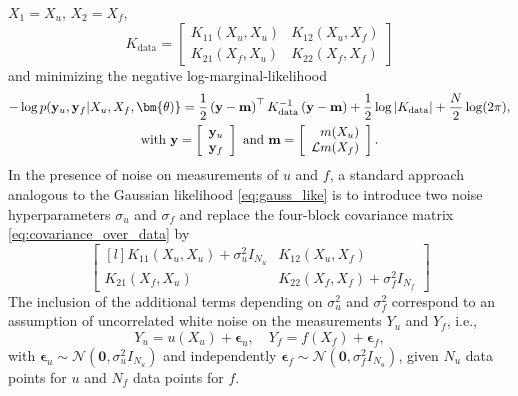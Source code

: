 ${X}_1 = {X}_u$, ${X}_2 = {X}_f$,
\begin{equation}\label{eq:covariance_over_data}
K_{\text{data}}=
\begin{bmatrix}
K_{11}({X}_u,{X}_u) & 
K_{12}({X}_u,{X}_f) \\ 
K_{21}({X}_f,{X}_u) &
K_{22}({X}_f,{X}_f)
\end{bmatrix}
\end{equation}
and minimizing the negative log-marginal-likelihood
\begin{multline}
\label{NLML}
-\log{p(\bold{y}_u,\bold{y}_f|X_u,X_f,\bm{\theta)}} = 
\frac{1}{2} \left(
\mathbf{y}-\mathbf{m}
\right)^{\top}
K_{\text{data}}^{-1}
\left(
\mathbf{y}-\mathbf{m}
\right)
 + \frac{1}{2}\log |{K}_{\text{data}}| + \frac{N}{2} \log (2\pi), \\
\text{with } 
\mathbf{y} 
= 
\left[
\begin{array}{c}
\mathbf{y}_u \\ 
\mathbf{y}_f
\end{array} 
\right]
\text{ and }
\mathbf{m} 
=
\left[
\begin{array}{c}
\phantom{\mathcal{L}} m({X}_u) \\ 
\mathcal{L} m({X}_f)
\end{array} 
\right].
\end{multline} 
In the presence of noise on measurements of $u$ and $f$, a standard approach analogous to the Gaussian likelihood \eqref{eq:gauss_like} is to introduce two noise hyperparameters $\sigma_{u}$ and $\sigma_{f}$ and replace the four-block covariance
matrix \eqref{eq:covariance_over_data} by 
\begin{equation}
\begin{bmatrix*}[l]
K_{11}({X}_u,{X}_u)          + \sigma_{u}^2 {I}_{N_u}& 
K_{12}({X}_u,{X}_f)\\ 
K_{21}({X}_f,{X}_u)&
K_{22}({X}_f,{X}_f)          + \sigma_{f}^2 {I}_{N_f}
\end{bmatrix*}
\end{equation}
The inclusion of the additional terms depending on $\sigma_{u}^2$ and $\sigma_{f}^2$ correspond to an assumption of uncorrelated 
white noise on the measurements ${Y}_u$ and ${Y}_f$, i.e., 
\begin{equation}
{Y}_u = u({X}_u) + \bm{\epsilon}_u, \quad
{Y}_f = f({X}_f) + \bm{\epsilon}_f,
\end{equation}
with $\bm{\epsilon}_u \sim \mathcal{N}(\mathbf{0},\sigma_{u}^2 {I}_{N_u})$ and independently $\bm{\epsilon}_f \sim \mathcal{N}(\mathbf{0},\sigma_{f}^2 {I}_{N_u})$, given $N_u$ data points for $u$ and $N_f$ data points for $f$. 
